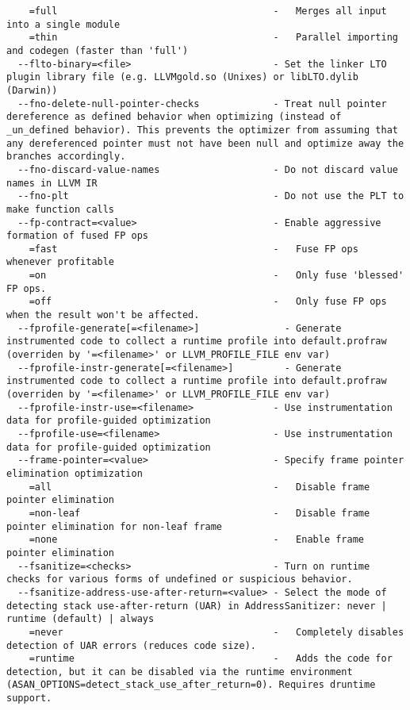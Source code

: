 \documentclass{studrep}
\begin{document}
\begin{verbatim}
    =full                                      -   Merges all input into a single module
    =thin                                      -   Parallel importing and codegen (faster than 'full')
  --flto-binary=<file>                         - Set the linker LTO plugin library file (e.g. LLVMgold.so (Unixes) or libLTO.dylib (Darwin))
  --fno-delete-null-pointer-checks             - Treat null pointer dereference as defined behavior when optimizing (instead of _un_defined behavior). This prevents the optimizer from assuming that any dereferenced pointer must not have been null and optimize away the branches accordingly.
  --fno-discard-value-names                    - Do not discard value names in LLVM IR
  --fno-plt                                    - Do not use the PLT to make function calls
  --fp-contract=<value>                        - Enable aggressive formation of fused FP ops
    =fast                                      -   Fuse FP ops whenever profitable
    =on                                        -   Only fuse 'blessed' FP ops.
    =off                                       -   Only fuse FP ops when the result won't be affected.
  --fprofile-generate[=<filename>]               - Generate instrumented code to collect a runtime profile into default.profraw (overriden by '=<filename>' or LLVM_PROFILE_FILE env var)
  --fprofile-instr-generate[=<filename>]         - Generate instrumented code to collect a runtime profile into default.profraw (overriden by '=<filename>' or LLVM_PROFILE_FILE env var)
  --fprofile-instr-use=<filename>              - Use instrumentation data for profile-guided optimization
  --fprofile-use=<filename>                    - Use instrumentation data for profile-guided optimization
  --frame-pointer=<value>                      - Specify frame pointer elimination optimization
    =all                                       -   Disable frame pointer elimination
    =non-leaf                                  -   Disable frame pointer elimination for non-leaf frame
    =none                                      -   Enable frame pointer elimination
  --fsanitize=<checks>                         - Turn on runtime checks for various forms of undefined or suspicious behavior.
  --fsanitize-address-use-after-return=<value> - Select the mode of detecting stack use-after-return (UAR) in AddressSanitizer: never | runtime (default) | always
    =never                                     -   Completely disables detection of UAR errors (reduces code size).
    =runtime                                   -   Adds the code for detection, but it can be disabled via the runtime environment (ASAN_OPTIONS=detect_stack_use_after_return=0). Requires druntime support.

\end{verbatim}
\end{document}
